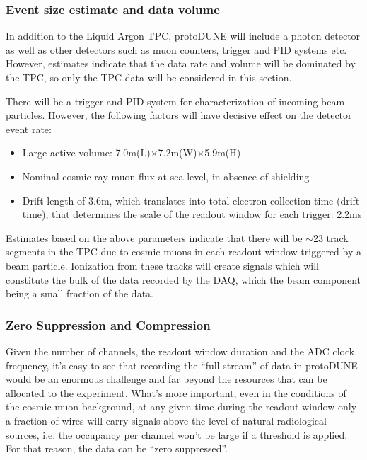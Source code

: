 \subsubsection{Event size estimate and data volume}
In addition to the Liquid Argon TPC, protoDUNE will include a photon detector as well as other detectors such as muon counters, trigger and PID systems etc.
However, estimates indicate that the data rate and volume will be dominated by the TPC, so only the TPC data will be considered in this section.


There will be a trigger and PID system for characterization of incoming beam particles. However, the following factors will have decisive effect on the detector event rate:
\begin{itemize}
\item Large active volume: 7.0m(L)$\times$7.2m(W)$\times$5.9m(H)
\item Nominal cosmic ray muon flux at sea level, in absence of shielding
\item Drift length of 3.6m, which translates into total electron collection time (drift time), that  determines the scale of the readout window for each trigger: 2.2ms
\end{itemize}

Estimates based on the above parameters indicate that there will be $\sim$23 track segments in the TPC due to cosmic muons in each readout window
triggered by a beam particle. Ionization from these tracks will create signals which will constitute the bulk of the data recorded by the DAQ, which the beam
component being a small fraction of the data.

\subsubsection{Zero Suppression and Compression}
Given the number of channels, the readout window duration and the ADC clock frequency, it's easy to see that recording the ``full stream'' of data
in protoDUNE would be an enormous challenge and far beyond the resources that can be allocated to the experiment. What's more important,
even in the conditions of the cosmic muon background, at any given time during the readout window only a fraction of wires will carry signals
above the level of natural radiological sources, i.e. the occupancy per channel won't be large if a threshold is applied. For that reason, the data can be ``zero suppressed''.

